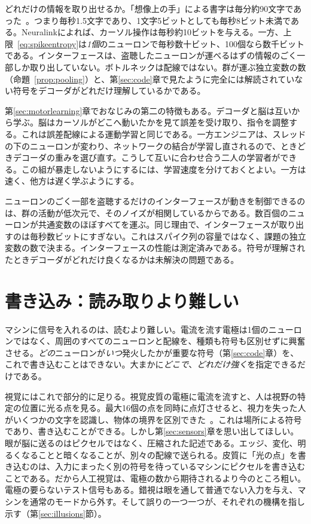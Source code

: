 どれだけの情報を取り出せるか。「想像上の手」による書字は毎分約90文字であった~\cite{Willett2021}。つまり毎秒1.5文字であり、1文字5ビットとしても毎秒8ビット未満である。Neuralinkによれば、カーソル操作は毎秒約10ビットを与える。一方、上限~\eqref{eq:spikeentropy}は\emph{1個}のニューロンで毎秒数十ビット、100個なら数千ビットである。インターフェースは、盗聴したニューロンが運べるはずの情報のごく一部しか取り出していない。ボトルネックは配線ではない。群が運ぶ独立変数の数（命題~\ref{prop:pooling}）と、第\ref{sec:code}章で見たように完全には解読されていない符号をデコーダがどれだけ理解しているかである。

第\ref{sec:motorlearning}章でおなじみの第二の特徴もある。デコーダと脳は互いから学ぶ。脳はカーソルがどこへ動いたかを見て誤差を受け取り、指令を調整する。これは誤差配線による運動学習と同じである。一方エンジニアは、スレッドの下のニューロンが変わり、ネットワークの結合が学習し直されるので、ときどきデコーダの重みを選び直す。こうして互いに合わせ合う二人の学習者ができる。この組が暴走しないようにするには、学習速度を分けておくとよい。一方は速く、他方は遅く学ぶようにする。

\begin{keyblock}
\begin{proposition}[1000ニューロンのプローブはなぜ働くか]
\label{prop:probe}
ニューロンのごく一部を盗聴するだけのインターフェースが動きを制御できるのは、群の活動が低次元で、そのノイズが相関しているからである。数百個のニューロンが共通変数のほぼすべてを運ぶ。同じ理由で、インターフェースが取り出すのは毎秒数ビットにすぎない。これはスパイク列の容量ではなく、課題の独立変数の数で決まる。インターフェースの性能は測定済みである。符号が理解されたときデコーダがどれだけ良くなるかは未解決の問題である。
\end{proposition}
\end{keyblock}

\section{書き込み：読み取りより難しい}

マシンに信号を入れるのは、読むより難しい。電流を流す電極は1個のニューロンではなく、周囲のすべてのニューロンと配線を、種類も符号も区別せずに興奮させる。\emph{どの}ニューロンが\emph{いつ}発火したかが重要な符号（第\ref{sec:code}章）を、これで書き込むことはできない。大まかに\emph{どこで}、\emph{どれだけ強く}を指定できるだけである。

視覚にはこれで部分的に足りる。視覚皮質の電極に電流を流すと、人は視野の特定の位置に光る点を見る。最大16個の点を同時に点灯させると、視力を失った人がいくつかの文字を認識し、物体の境界を区別できた~\cite{Fernandez2021}。これは場所による符号であり、書き込むことができる。しかし第\ref{sec:sensors}章を思い出してほしい。眼が脳に送るのはピクセルではなく、圧縮された記述である。エッジ、変化、明るくなることと暗くなることが、別々の配線で送られる。皮質に「光の点」を書き込むのは、入力にまったく別の符号を待っているマシンにピクセルを書き込むことである。だから人工視覚は、電極の数から期待されるより今のところ粗い。電極の要らないテスト信号もある。錯視は眼を通して普通でない入力を与え、マシンを通常のモードから外す。そして誤りの一つ一つが、それぞれの機構を指し示す（第\ref{sec:illusions}節）。

